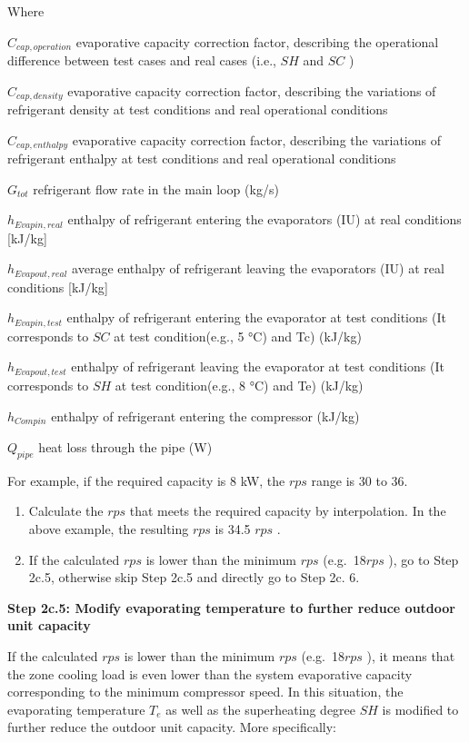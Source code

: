 Where

\(C_{cap,operation}\) evaporative capacity correction factor, describing the operational difference between test cases and real cases (i.e., \(SH\) and \(SC\) )

\(C_{cap,density}\) evaporative capacity correction factor, describing the variations of refrigerant density at test conditions and real operational conditions

\(C_{cap,enthalpy}\) evaporative capacity correction factor, describing the variations of refrigerant enthalpy at test conditions and real operational conditions

\(G_{tot}\) refrigerant flow rate in the main loop (kg/s)

\(h_{Evapin,real}\) enthalpy of refrigerant entering the evaporators (IU) at real conditions {[}kJ/kg{]}

\(h_{Evapout,real}\) average enthalpy of refrigerant leaving the evaporators (IU) at real conditions {[}kJ/kg{]}

\(h_{Evapin,test}\) enthalpy of refrigerant entering the evaporator at test conditions (It corresponds to \(SC\) at test condition(e.g., 5 °C) and Tc) (kJ/kg)

\(h_{Evapout,test}\) enthalpy of refrigerant leaving the evaporator at test conditions (It corresponds to \(SH\) at test condition(e.g., 8 °C) and Te) (kJ/kg)

\(h_{Compin}\) enthalpy of refrigerant entering the compressor (kJ/kg)

\(Q_{pipe}\) heat loss through the pipe (W)

For example, if the required capacity is 8 kW, the \(rps\) range is 30 to 36.

\begin{enumerate}
\def\labelenumi{\alph{enumi}.}
\setcounter{enumi}{2}
\item
  Calculate the \(rps\) that meets the required capacity by interpolation. In the above example, the resulting \(rps\) is 34.5 \(rps\) .
\item
  If the calculated \(rps\) is lower than the minimum \(rps\) (e.g.~18\(rps\) ), go to Step 2c.5, otherwise skip Step 2c.5 and directly go to Step 2c. 6.
\end{enumerate}

\textbf{Step 2c.5: Modify evaporating temperature to further reduce outdoor unit capacity} 

If the calculated \(rps\) is lower than the minimum \(rps\) (e.g.~18\(rps\) ), it means that the zone cooling load is even lower than the system evaporative capacity corresponding to the minimum compressor speed. In this situation, the evaporating temperature \(T_e\) as well as the superheating degree \(SH\) is modified to further reduce the outdoor unit capacity. More specifically:

